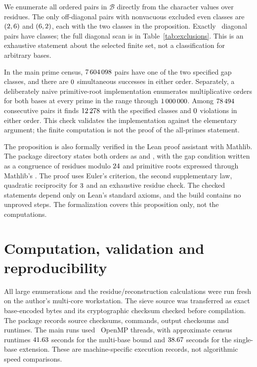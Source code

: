 \documentclass[11pt]{article}
\begin{document}
We enumerate all ordered pairs in $\mathcal B$ directly from the character
values over residues. The only off-diagonal pairs with nonvacuous excluded even
classes are $(2,6)$ and $(6,2)$, each with the two classes in the
proposition. Exactly \DiagonalHits\ diagonal pairs have classes; the full
diagonal scan is in Table~\ref{tab:exclusions}. This is an exhaustive statement
about the selected finite set, not a classification for arbitrary bases.

\begin{table}[htbp]\centering

\caption{Diagonal part of the finite character scan. An empty set is recorded
as none; it does not assert existence of Artin pairs in every shift.}
\label{tab:exclusions}
\end{table}

In the main prime census, $7\,604\,098$ pairs have one of the two specified gap
classes, and there are $0$ simultaneous successes in either
order. Separately, a deliberately naive primitive-root implementation enumerates
multiplicative orders for both bases at every prime in the range through
$1\,000\,000$. Among $78\,494$ consecutive pairs it finds $12\,278$
with the specified classes and $0$ violations in either order.
This check validates the implementation against the elementary argument; the
finite computation is not the proof of the all-primes statement.

The proposition is also formally verified in the Lean proof assistant with Mathlib. The package
directory  states both orders as
 and
, with the gap condition
written as a congruence of residues modulo $24$ and primitive roots
expressed through Mathlib's . The proof uses Euler's
criterion, the second supplementary law, quadratic reciprocity for $3$ and
an exhaustive residue check. The checked statements depend only on Lean's
standard axioms, and the build contains no unproved steps. The formalization
covers this proposition only, not the computations.

\section{Computation, validation and reproducibility}
All large enumerations and the residue/reconstruction calculations were run
fresh on the author's multi-core workstation. The sieve source was transferred as exact
base-encoded bytes and its cryptographic checksum checked before compilation. The package
records source checksums, commands, output checksums and runtimes. The main
runs used \Threads\ OpenMP threads, with approximate census runtimes
$41.63$ seconds for the multi-base bound and $38.67$ seconds
for the single-base extension. These are machine-specific execution records,
not algorithmic speed comparisons.
\end{document}
